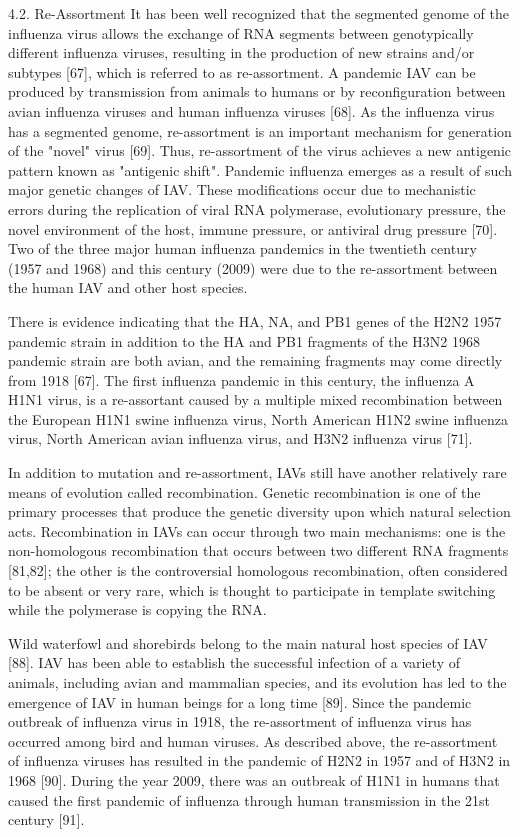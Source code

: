 \documentclass[onecolumn, compsoc,10pt]{IEEEtran}
\begin{document}
{  4.2. Re-Assortment
  It has been well recognized that the segmented genome of the influenza virus allows the exchange of RNA segments between genotypically different influenza viruses, resulting in the production of new strains and/or subtypes [67], which is referred to as re-assortment. A pandemic IAV can be produced by transmission from animals to humans or by reconfiguration between avian influenza viruses and human influenza viruses [68]. As the influenza virus has a segmented genome, re-assortment is an important mechanism for generation of the "novel" virus [69]. Thus, re-assortment of the virus achieves a new antigenic pattern known as "antigenic shift". Pandemic influenza emerges as a result of such major genetic changes of IAV. These modifications occur due to mechanistic errors during the replication of viral RNA polymerase, evolutionary pressure, the novel environment of the host, immune pressure, or antiviral drug pressure [70]. Two of the three major human influenza pandemics in the twentieth century (1957 and 1968) and this century (2009) were due to the re-assortment between the human IAV and other host species.


  There is evidence indicating that the HA, NA, and PB1 genes of the H2N2 1957 pandemic strain in addition to the HA and PB1 fragments of the H3N2 1968 pandemic strain are both avian, and the remaining fragments may come directly from 1918 [67]. The first influenza pandemic in this century, the influenza A H1N1 virus, is a re-assortant caused by a multiple mixed recombination between the European H1N1 swine influenza virus, North American H1N2 swine influenza virus, North American avian influenza virus, and H3N2 influenza virus [71].

  In addition to mutation and re-assortment, IAVs still have another relatively rare means of evolution called recombination. Genetic recombination is one of the primary processes that produce the genetic diversity upon which natural selection acts. Recombination in IAVs can occur through two main mechanisms: one is the non-homologous recombination that occurs between two different RNA fragments [81,82]; the other is the controversial homologous recombination, often considered to be absent or very rare, which is thought to participate in template switching while the polymerase is copying the RNA.



  Wild waterfowl and shorebirds belong to the main natural host species of IAV [88]. IAV has been able to establish the successful infection of a variety of animals, including avian and mammalian species, and its evolution has led to the emergence of IAV in human beings for a long time [89]. Since the pandemic outbreak of influenza virus in 1918, the re-assortment of influenza virus has occurred among bird and human viruses. As described above, the re-assortment of influenza viruses has resulted in the pandemic of H2N2 in 1957 and of H3N2 in 1968 [90]. During the year 2009, there was an outbreak of H1N1 in humans that caused the first pandemic of influenza through human transmission in the 21st century [91].

}
\end{document}

